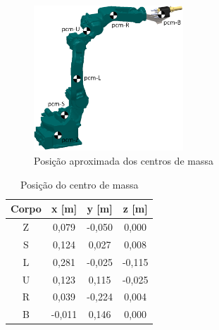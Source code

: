 \begin{figure}[h]
	\centering 
 	\includegraphics[width=0.5\textwidth]{figs/pcm_mh12}
 	\caption{Posição aproximada dos centros de massa}
 	\label{fig::pcm_mh12}
\end{figure}

%
\begin{table}[h] \centering
\caption{Posição do centro de massa}
\label{tab::resumo_cm}
\begin{tabular}{@{}cccc@{}}
\toprule
\textbf{Corpo} & \textbf{x [m]} & \textbf{y [m]} & \textbf{z [m]} \\ \midrule
Z              & 0,079      & -0,050     & 0,000      \\
S              & 0,124      & 0,027      & 0,008      \\
L              & 0,281      & -0,025     & -0,115     \\
U              & 0,123      & 0,115      & -0,025     \\
R              & 0,039      & -0,224     & 0,004      \\
B              & -0,011     & 0,146      & 0,000      \\ \bottomrule
\end{tabular}
\end{table}
%

